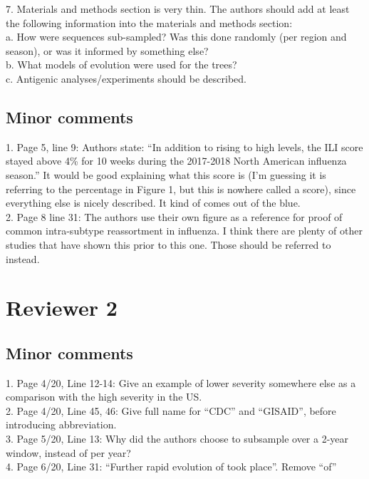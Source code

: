 \documentclass[11pt,oneside,letterpaper]{article}
\begin{document}
7. Materials and methods section is very thin. The authors should add at least the following information into the materials and methods section: \\
a.      How were sequences sub-sampled? Was this done randomly (per region and season), or was it informed by something else?\\
b.      What models of evolution were used for the trees?\\
c.      Antigenic analyses/experiments should be described.\\
\subsection*{Minor comments}
1. Page 5, line 9: Authors state: “In addition to rising to high levels, the ILI score stayed above 4\% for 10 weeks during the 2017-2018 North American influenza season.” It would be good explaining what this score is (I’m guessing it is referring to the percentage in Figure 1, but this is nowhere called a score), since everything else is nicely described. It kind of comes out of the blue.\\

2. Page 8 line 31: The authors use their own figure as a reference for proof of common intra-subtype reassortment in influenza. I think there are plenty of other studies that have shown this prior to this one. Those should be referred to instead.\\

\section*{Reviewer 2}
\subsection*{Minor comments}
1. Page 4/20, Line 12-14: Give an example of lower severity somewhere else as a comparison with the high severity in the US.\\

2. Page 4/20, Line 45, 46: Give full name for “CDC” and “GISAID”, before introducing abbreviation.\\

3. Page 5/20, Line 13: Why did the authors choose to subsample over a 2-year window, instead of per year?\\

4. Page 6/20, Line 31: “Further rapid evolution of took place”. Remove “of”\\
\end{document}
